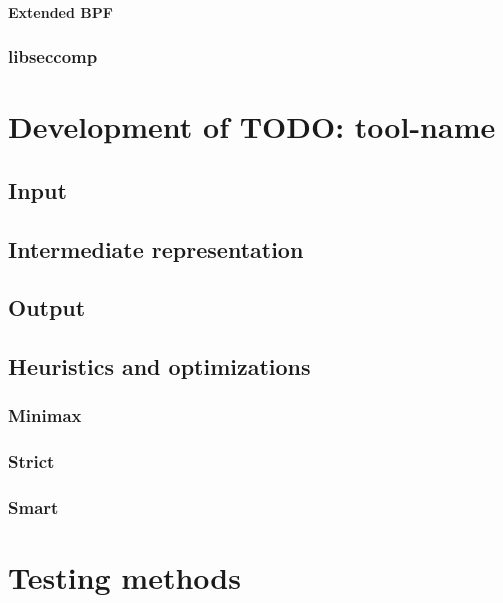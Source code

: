 \subsubsection{Extended BPF}

\subsection{libseccomp}


\chapter{Development of TODO: tool-name}
\section{Input}
\section{Intermediate representation}
\section{Output}
\section{Heuristics and optimizations}
\subsection{Minimax}
\subsection{Strict}
\subsection{Smart}


\chapter{Testing methods}


